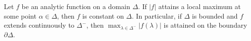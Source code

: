 Let $f$ be an analytic function on a domain $\Delta$. If $|f|$ attains a local maximum at some point $\alpha \in \Delta$, then $f$ is constant on $\Delta$. In particular, if $\Delta$ is bounded and $f$ extends continuously to $\Delta^-$, then $\max_{\lambda \in \Delta^-} |f(\lambda)|$ is attained on the boundary $\partial \Delta$.
